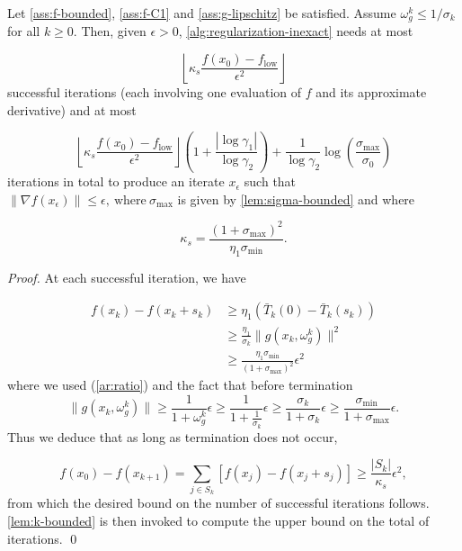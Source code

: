 \documentclass[runningheads,orivec,oribibl]{llncs}
\begin{document}
\begin{theorem}
  Let \autoref{ass:f-bounded}, \autoref{ass:f-C1} and \autoref{ass:g-lipschitz} be satisfied.
  Assume \(\omega_g^k \leq 1/\sigma_k\) for all \(k \geq 0\).
  Then, given \(\epsilon > 0\), \autoref{alg:regularization-inexact} needs at most

  \begin{equation*}
    \left\lfloor\kappa_s \frac{f(x_0)-f_\mathrm{low}}{\epsilon^2}\right\rfloor
  \end{equation*}
  successful iterations (each involving one evaluation of \(f\) and its approximate derivative) and at most

  \begin{equation*}
    \left\lfloor
    \kappa_s \frac{f(x_0)-f_\mathrm{low}}{\epsilon^2}
    \right\rfloor
    \left( 1+\frac{|\log \gamma_1|}{\log \gamma_2} \right) +
    \frac{1}{\log\gamma_2}
    \log \left( \frac{\sigma_{\max}}{\sigma_0}\right)
  \end{equation*}
  iterations in total to produce an iterate \(x_{\epsilon}\) such that
  \(\|\nabla f(x_{\epsilon})\| \leq \epsilon, \ \text{where} \ \sigma_{\max}\) is given by \autoref{lem:sigma-bounded} and where

  \begin{equation*}
    \kappa_s =\frac{(1+\sigma_{\max})^2}{\eta_1\sigma_{\min}}.
  \end{equation*}

\end{theorem}

\begin{proof}
At each successful iteration, we have

\begin{align*}
  f(x_k) - f(x_k+s_k)
  & \geq \eta_1(\bar{T}_k(0)-\bar{T}_k(s_k)) \\
  & \geq \frac{\eta_1}{\sigma_k}\|g(x_k,\omega_g^k)\|^2 \\
  & \geq \frac{\eta_1\sigma_{\min}}{(1+\sigma_{\max})^2}\epsilon^2
\end{align*}
where we used (\ref{ar:ratio}) and the fact that before termination
\begin{equation*}
  \|g(x_k,\omega_g^k)\|
  \geq \frac{1}{1+\omega_g^k} \epsilon
  \geq \frac{1}{1+ \frac{1}{\sigma_k}} \epsilon
  \geq \frac{\sigma_k}{1+\sigma_k} \epsilon
  \geq \frac{\sigma_{\min}}{1 + \sigma_{\max}}\epsilon.
\end{equation*}
Thus we deduce that as long as termination does not occur,

\begin{equation}
  f(x_0)-f(x_{k+1}) = \sum_{j\in S_k}[f(x_j)-f(x_j+s_j)]\geq \frac{|S_k|}{\kappa_s}\epsilon^2,
\end{equation}
from which the desired bound on the number of successful iterations follows.
\autoref{lem:k-bounded} is then invoked to compute the upper bound on the total of iterations.
\qed

\end{proof}
\end{document}
